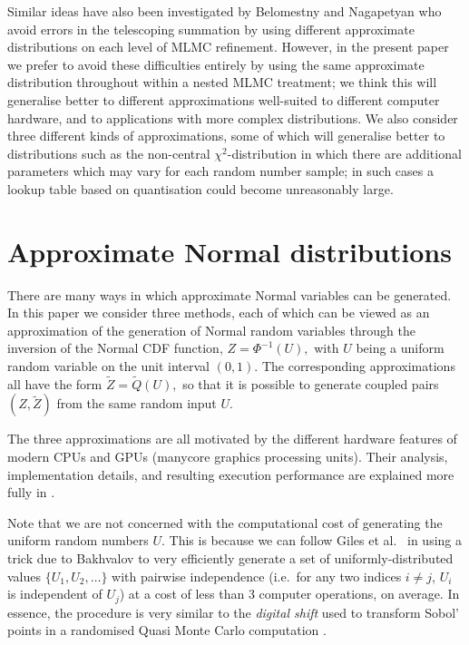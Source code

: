 \documentclass[11pt]{article}
\def \tQ {{\widetilde{Q}}}
\def \tZ {{\widetilde{Z}}}
\begin{document}
Similar ideas have also been investigated by Belomestny and Nagapetyan \cite{bn17}
who avoid errors in the telescoping summation by using different approximate
distributions on each level of MLMC refinement.  However, in the present paper
we prefer to avoid these difficulties entirely by using the same approximate
distribution throughout within a nested MLMC treatment; we think this will
generalise better to different approximations well-suited to different
computer hardware, and to applications with more complex distributions.
We also consider three different kinds of approximations, some of which
will generalise better to distributions such as the non-central
$\chi^2$-distribution in which there are additional parameters which may
vary for each random number sample; in such cases a lookup table based
on quantisation could become unreasonably large. 

\section{Approximate Normal distributions}

\label{sec:approximations}

There are many ways in which approximate Normal variables can be generated.
In this paper we consider three methods, each of which can be viewed as an
approximation of the generation of Normal random variables
through the inversion of the Normal CDF function,
$\displaystyle
Z = \Phi^{-1}(U),
$
with $U$ being a uniform random variable on the unit interval $(0,1)$.
The corresponding approximations all have the form
$\displaystyle
\tZ = \tQ(U),
$
so that it is possible to generate coupled pairs $(Z,\tZ)$ 
from the same random input $U$.

The three approximations are all motivated by the different hardware features 
of modern CPUs and GPUs (manycore graphics processing units). Their analysis, 
implementation details, and resulting execution performance are explained more fully in \cite{sheridanmethven2020approximating,sheridan-methven2020thesis}.

Note that we are not concerned with the computational cost of generating the 
uniform random numbers $U$.  This is because we can follow 
Giles et al.~\cite{ghmr19b} in using a trick due to 
Bakhvalov \cite{bakhvalov64} to very efficiently 
generate a set of uniformly-distributed values $\{ U_1, U_2, \ldots\}$ 
with pairwise independence (i.e.~for any two indices $i\neq j$, $U_i$ 
is independent of $U_j$) at a cost of less than 3 computer operations, 
on average.
In essence, the procedure is very similar to the \emph{digital shift} 
used to transform Sobol' points in a randomised Quasi Monte Carlo 
computation \cite{ecuyer2016randomized}.
\end{document}
